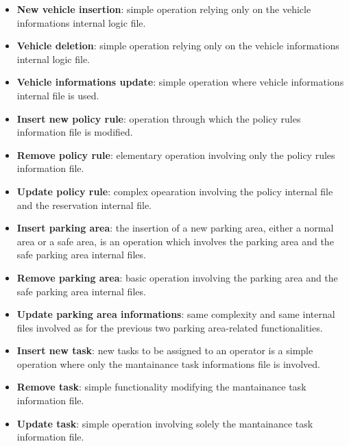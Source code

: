 \begin{itemize}
	\item \textbf{New vehicle insertion}: simple operation relying only on the vehicle informations internal logic file.

	\item \textbf{Vehicle deletion}: simple operation relying only on the vehicle informations internal logic file.

	\item \textbf{Vehicle informations update}: simple operation where vehicle informations internal file is used.

	\item \textbf{Insert new policy rule}: operation through which the policy rules information file is modified.

	\item \textbf{Remove policy rule}: elementary operation involving only the policy rules information file.

	\item \textbf{Update policy rule}: complex opearation involving the policy internal file and the reservation internal file.

	\item \textbf{Insert parking area}: the insertion of a new parking area, either a normal area or a safe area, is an operation which involves the parking area and the safe parking area internal files.

	\item \textbf{Remove parking area}: basic operation involving the parking area and the safe parking area internal files.

	\item \textbf{Update parking area informations}: same complexity and same internal files involved as for the previous two parking area-related functionalities.

	\item \textbf{Insert new task}: new tasks to be assigned to an operator is a simple operation where only the mantainance task informations file is involved.

	\item \textbf{Remove task}: simple functionality modifying the mantainance task information file.

	\item \textbf{Update task}: simple operation involving solely the mantainance task information file.
\end{itemize}

